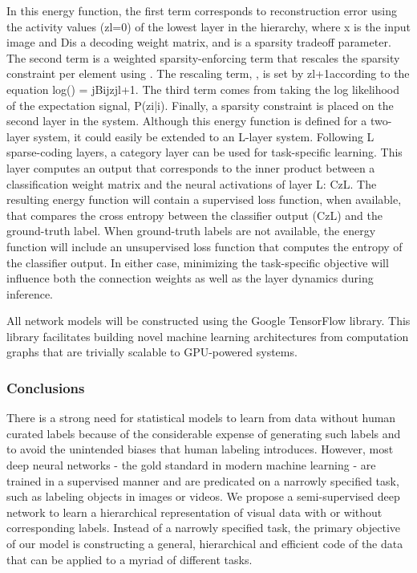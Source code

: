 In this energy function, the first term corresponds to reconstruction error using the activity values (zl=0) of the lowest layer in the hierarchy, where x is the input image and Dis a decoding weight matrix, and is a sparsity tradeoff parameter. The second term is a weighted sparsity-enforcing term that rescales the sparsity constraint per element using . The rescaling term, , is set by zl+1according to the equation log() = jBijzjl+1. The third term comes from taking the log likelihood of the expectation signal, P(zi|i). Finally, a sparsity constraint is placed on the second layer in the system. Although this energy function is defined for a two-layer system, it could easily be extended to an L-layer system. Following L sparse-coding layers, a category layer can be used for task-specific learning. This layer computes an output that corresponds to the inner product between a classification weight matrix and the neural activations of layer L: CzL. The resulting energy function will contain a supervised loss function, when available, that compares the cross entropy between the classifier output (CzL) and the ground-truth label. When ground-truth labels are not available, the energy function will include an unsupervised loss function that computes the entropy of the classifier output. In either case, minimizing the task-specific objective will influence both the connection weights as well as the layer dynamics during inference.

All network models will be constructed using the Google TensorFlow library. This library facilitates building novel machine learning architectures from computation graphs that are trivially scalable to GPU-powered systems.

\subsubsection{Conclusions}
There is a strong need for statistical models to learn from data without human curated labels because of the considerable expense of generating such labels and to avoid the unintended biases that human labeling introduces. However, most deep neural networks - the gold standard in modern machine learning - are trained in a supervised manner and are predicated on a narrowly specified task, such as labeling objects in images or videos. We propose a semi-supervised deep network to learn a hierarchical representation of visual data with or without corresponding labels. Instead of a narrowly specified task, the primary objective of our model is constructing a general, hierarchical and efficient code of the data that can be applied to a myriad of different tasks.